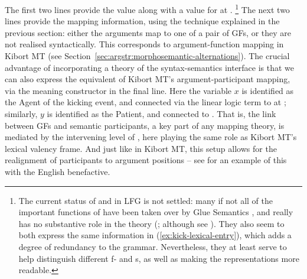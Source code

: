 \documentclass[output=paper]{langscibook}
\begin{document}
\ea\label{ex:kick-lexical-entry}
\z
%
\largerpage
The first two lines provide the \PRED value along with a value for \REL at \sstruc{}.%
%
\footnote{The current status of \PRED and \REL in LFG is not settled: many if
  not all of the important functions of \PRED have been taken over by Glue
  Semantics \citep{andrews2008}, and \REL really has no substantive role in the
  theory (\citealt[169ff.]{Lovestrand2018}; although see \citealt{Lowe2014}).
  They also seem to both express the same information in
  (\ref{ex:kick-lexical-entry}), which adds a degree of redundancy to the
  grammar. Nevertheless, they at least serve to help distinguish different f-
  and \sstruc{}s, as well as making the representations more readable.}
%
The next two lines provide the mapping information, using the technique
explained in the previous section: either the arguments map to one of a pair of
GFs, or they are not realised syntactically. This corresponds to
argument-function mapping in Kibort MT (see
Section~\ref{sec:argstr:morphosemantic-alternations}). The crucial advantage of
incorporating a theory of the syntax-semantics interface is that we can also
express the equivalent of Kibort MT's argument-participant mapping, via the
meaning constructor in the final line. Here the variable $x$ is identified as
the Agent of the kicking event, and connected via the linear logic term to
 at \sstruc{}; similarly, $y$ is identified as the Patient, and
connected to . That is, the link between GFs and semantic
participants, a key part of any mapping theory, is mediated by the intervening
level of \sstruc, here playing the same role as Kibort MT's lexical valency
frame. And just like in Kibort MT, this setup allows for the realignment of
participants to argument positions -- see \citet[328--332]{findlay2017mapping}
for an example of this with the English benefactive.
\end{document}
